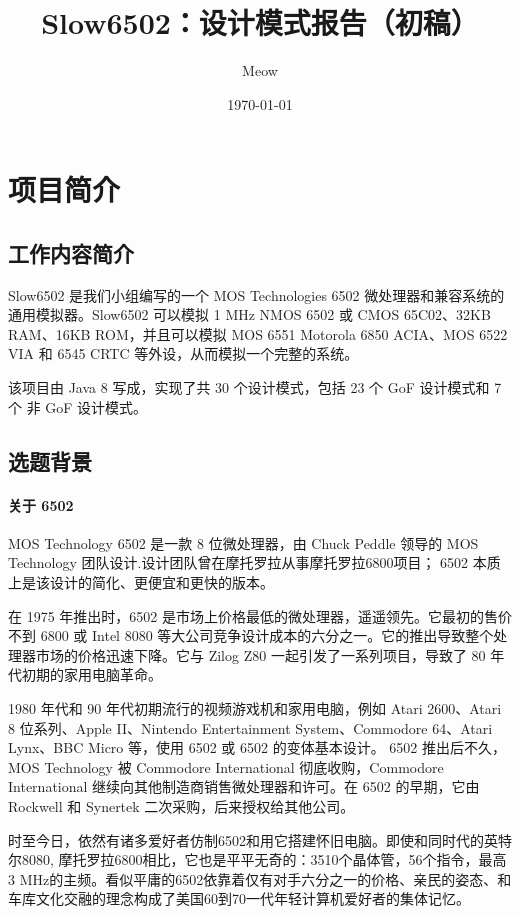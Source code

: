 \documentclass[cn,black,12pt,normal]{elegantnote}
\title{Slow6502：设计模式报告（初稿）}
\author{Meow}
\institute{软件学院}
\date{\today}
\begin{document}
\maketitle

\tableofcontents

\newpage

\section{项目简介}

\subsection{工作内容简介}

Slow6502 是我们小组编写的一个 MOS Technologies 6502 微处理器和兼容系统的通用模拟器。Slow6502 可以模拟 1 MHz NMOS 6502 或 CMOS 65C02、32KB RAM、16KB ROM，并且可以模拟 MOS 6551 Motorola 6850 ACIA、MOS 6522 VIA 和 6545 CRTC 等外设，从而模拟一个完整的系统。

该项目由 Java 8 写成，实现了共 30 个设计模式，包括 23 个 GoF 设计模式和 7 个 非 GoF 设计模式。

\subsection{选题背景}

\paragraph{关于 6502} MOS Technology 6502 是一款 8 位微处理器，由 Chuck Peddle 领导的 MOS Technology 团队设计.设计团队曾在摩托罗拉从事摩托罗拉6800项目； 6502 本质上是该设计的简化、更便宜和更快的版本。

在 1975 年推出时，6502 是市场上价格最低的微处理器，遥遥领先。它最初的售价不到 6800 或 Intel 8080 等大公司竞争设计成本的六分之一。它的推出导致整个处理器市场的价格迅速下降。它与 Zilog Z80 一起引发了一系列项目，导致了 80 年代初期的家用电脑革命。

1980 年代和 90 年代初期流行的视频游戏机和家用电脑，例如 Atari 2600、Atari 8 位系列、Apple II、Nintendo Entertainment System、Commodore 64、Atari Lynx、BBC Micro 等，使用 6502 或 6502 的变体基本设计。 6502 推出后不久，MOS Technology 被 Commodore International 彻底收购，Commodore International 继续向其他制造商销售微处理器和许可。在 6502 的早期，它由 Rockwell 和 Synertek 二次采购，后来授权给其他公司。

时至今日，依然有诸多爱好者仿制6502和用它搭建怀旧电脑。即使和同时代的英特尔8080, 摩托罗拉6800相比，它也是平平无奇的：3510个晶体管，56个指令，最高3 MHz的主频。看似平庸的6502依靠着仅有对手六分之一的价格、亲民的姿态、和车库文化交融的理念构成了美国60到70一代年轻计算机爱好者的集体记忆。
\end{document}
